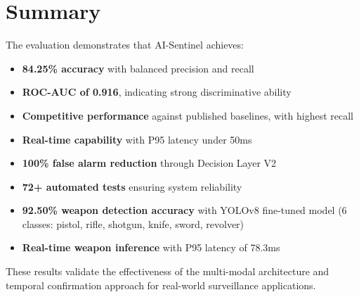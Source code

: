 \section{Summary}
\label{sec:eval_summary}

The evaluation demonstrates that AI-Sentinel achieves:

\begin{itemize}
    \item \textbf{84.25\% accuracy} with balanced precision and recall
    \item \textbf{ROC-AUC of 0.916}, indicating strong discriminative ability
    \item \textbf{Competitive performance} against published baselines, with highest recall
    \item \textbf{Real-time capability} with P95 latency under 50ms
    \item \textbf{100\% false alarm reduction} through Decision Layer V2
    \item \textbf{72+ automated tests} ensuring system reliability
    \item \textbf{92.50\% weapon detection accuracy} with YOLOv8 fine-tuned model (6 classes: pistol, rifle, shotgun, knife, sword, revolver)
    \item \textbf{Real-time weapon inference} with P95 latency of 78.3ms
\end{itemize}

These results validate the effectiveness of the multi-modal architecture and temporal confirmation approach for real-world surveillance applications.
\newpage